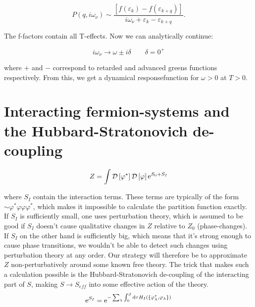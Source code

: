 \begin{equation*}
    P(q,i\omega_\nu)  \sim \frac{\left[ f(\varepsilon_k) - f(\varepsilon_{k+q})\right]}{i\omega_\nu + \varepsilon_k - \varepsilon_{k+q}}. 
\end{equation*}

The f-factors contain all T-effects. Now we can analytically continue: 

\begin{equation*}
    i\omega_\nu \to \omega \pm i\delta \quad \quad \delta = 0^{+}
\end{equation*}

where $+$ and $-$ correspond to retarded and advanced greens functions respectively. From this, we get a dynamical responsefunction for $\omega > 0$ at $T > 0$. 

\section[Interaction \& HS-decoupling]{Interacting fermion-systems and the Hubbard-Stratonovich de-coupling}

\begin{equation*}
    Z = \int \mathcal{D} \left[ \varphi^*\right] \mathcal{D} \left[\varphi\right] \mathrm{e}^{S_0 + S_I}
\end{equation*}

where $S_I$ contain the interaction terms. These terms are typically of the form $\sim \varphi^*\varphi \varphi \varphi^*$, which makes it impossible to calculate the partition function exactly. If $S_I$ is sufficiently small, one uses perturbation theory, which is assumed to be good if $S_I$ doesn't cause qualitative changes in $Z$ relative to $Z_0$ (phase-changes). \\ 

If $S_I$ on the other hand is sufficiently big, which means that it's strong enough to cause phase transitions, we wouldn't be able to detect such changes using perturbation theory at any order. Our strategy will therefore be to approximate $Z$ non-perturbatively around some known free theory. The trick that makes such a calculation possible is the Hubbard-Stratonovich de-coupling of the interacting part of $S$, making $S \to S_{eff}$ into some effective action of the theory. \\

\begin{equation*}
    \mathrm{e}^{S_I} = \mathrm{e}^{-\sum_\lambda \int_{0}^{\beta} \dd \tau H_I(\{ \varphi^*_\lambda, \varphi_\lambda\})}
\end{equation*}

